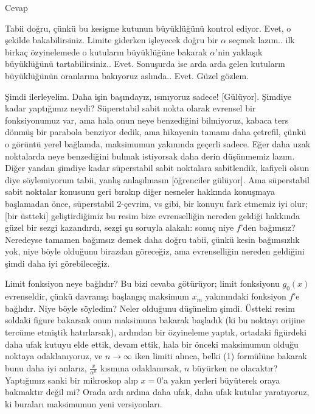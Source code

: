 \documentclass[12pt,fleqn]{article}\usepackage{../../common}
\begin{document}
Cevap

Tabii doğru, çünkü bu kesişme kutunun büyüklüğünü kontrol ediyor. Evet, o
şekilde bakabilirsiniz. Limite giderken işleyecek doğru bir $\alpha$ seçmek
lazım.. ilk birkaç özyinelemede o kutuların büyüklüğüne bakarak $\alpha$'nin
yaklaşık büyüklüğünü tartabilirsiniz.. Evet. Sonuşurda ise arda arda gelen
kutuların büyüklüğünün oranlarına bakıyoruz aslında.. Evet. Güzel gözlem.

Şimdi ilerleyelim. Daha işin başındayız, ısınıyoruz sadece!
[Gülüyor]. Şimdiye kadar yaptığımız neydi? Süperstabil sabit nokta olarak
evrensel bir fonksiyonumuz var, ama hala onun neye benzediğini bilmiyoruz,
kabaca ters dönmüş bir parabola benziyor dedik, ama hikayenin tamamı daha
çetrefil, çünkü o görüntü yerel bağlamda, maksimumun yakınında geçerli
sadece. Eğer daha uzak noktalarda neye benzediğini bulmak istiyorsak daha
derin düşünmemiz lazım. Diğer yandan şimdiye kadar süperstabil sabit
noktalara sabitlendik, kafiyeli olsun diye söylemiyorum tabii, yanlış
anlaşılmasın [öğrenciler gülüyor]. Ama süperstabil sabit noktalar konusunu
geri bırakıp diğer nesneler hakkında konuşmaya başlamadan önce, süperstabil
2-çevrim, vs gibi, bir konuyu fark etmemiz iyi olur; [bir üstteki]
geliştirdiğimiz bu resim bize evrenselliğin nereden geldiği hakkında güzel
bir sezgi kazandırdı, sezgi şu soruyla alakalı: sonuç niye $f$'den
bağımsız?  Neredeyse tamamen bağımsız demek daha doğru tabii, çünkü kesin
bağımsızlık yok, niye böyle olduğunu birazdan göreceğiz, ama evrenselliğin
nereden geldiğini şimdi daha iyi görebileceğiz.

Limit fonksiyon neye bağlıdır? Bu bizi cevaba götürüyor; limit fonksiyonu
$g_0(x)$ evrenseldir, çünkü davranışı başlangıç maksimum $x_m$ yakınındaki
fonksiyon $f$'e bağlıdır. Niye böyle söyledim? Neler olduğunu düşünelim
şimdi. Üstteki resim soldaki figure bakarsak onun maksimuna bakarak
başladık (ki bu noktayı orijine tercüme etmiştik hatırlarsak), ardından bir
özyineleme yaptık, ortadaki figürdeki daha ufak kutuyu elde ettik, devam
ettik, hala bir önceki maksimumun olduğu noktaya odaklanıyoruz, ve
$n \to \infty$ iken limiti alınca, belki (1) formülüne bakarak bunu daha
iyi anlarız, $\frac{x}{\alpha^{n}}$ kısmına odaklanırsak, $n$ büyürken ne
olacaktır?  Yaptığımız sanki bir mikroskop alıp $x=0$'a yakın yerleri
büyüterek oraya bakmaktır değil mi? Orada ardı ardına daha ufak, daha ufak
kutular yaratıyoruz, ki buraları maksimumun yeni versiyonları.
\end{document}
